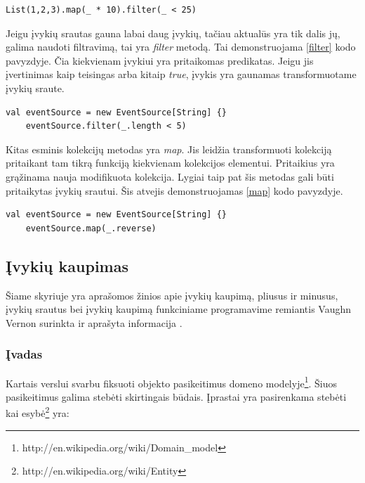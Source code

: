 \begin{lstlisting}[caption=- kolekcijos transformacijos, label=collectionTransformation]
	List(1,2,3).map(_ * 10).filter(_ < 25)
\end{lstlisting}

Jeigu įvykių srautas gauna labai daug įvykių, tačiau aktualūs yra tik dalis jų, galima naudoti filtravimą, tai yra \textit{filter} metodą. Tai demonstruojama \ref{filter} kodo pavyzdyje. Čia kiekvienam įvykiui yra pritaikomas predikatas. Jeigu jis įvertinimas kaip teisingas arba kitaip \textit{true}, įvykis yra gaunamas transformuotame įvykių sraute.

\begin{lstlisting}[caption=- įvykių srauto filtravimas, label=filter]
	val eventSource = new EventSource[String] {}
	eventSource.filter(_.length < 5)
\end{lstlisting}

Kitas esminis kolekcijų metodas yra \textit{map}. Jis leidžia transformuoti kolekciją pritaikant tam tikrą funkciją kiekvienam kolekcijos elementui. Pritaikius yra grąžinama nauja modifikuota kolekcija. Lygiai taip pat šis metodas gali būti pritaikytas įvykių srautui. Šis atvejis demonstruojamas \ref{map} kodo pavyzdyje. 

\begin{lstlisting}[caption=- įvykių visiškas transformavimas, label=map]
	val eventSource = new EventSource[String] {}
	eventSource.map(_.reverse)
\end{lstlisting}


\subsection{Įvykių kaupimas}

Šiame skyriuje yra aprašomos žinios apie įvykių kaupimą, pliusus ir minusus, įvykių srautus bei įvykių kaupimą funkciniame programavime remiantis Vaughn Vernon surinkta ir aprašyta informacija \cite{vernon2013implementing}.

\subsubsection{Įvadas}

Kartais verslui svarbu fiksuoti objekto pasikeitimus domeno modelyje\footnote{http://en.wikipedia.org/wiki/Domain\_model}. Šiuos pasikeitimus galima stebėti skirtingais būdais. Įprastai yra pasirenkama stebėti kai esybė\footnote{http://en.wikipedia.org/wiki/Entity} yra:

